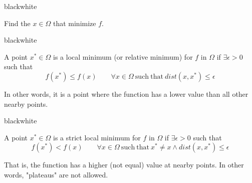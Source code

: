 \begin{remark}{black}{white}
    \begin{definition}
        Find the \( x \in \Omega \) that minimize \( f \).
    \end{definition}
\end{remark}

\begin{remark}{black}{white}
    \begin{definition}
        A point \( x^* \in \Omega \) is a local minimum (or relative minimum) for \( f \) in \( \Omega \) if \( \exists \epsilon > 0 \) such that
        \[
            f(x^*) \leq f(x) \qquad \forall x \in \Omega \mathrm{~such~that~} \mathit{dist}(x, x^*) \leq \epsilon
        \]
    \end{definition}
\end{remark}

In other words, it is a point where the function has a lower value than all other nearby points.

\begin{center}
\end{center}

\begin{remark}{black}{white}
    \begin{definition}
        A point \( x^* \in \Omega \) is a strict local minimum for \( f \) in \( \Omega \) if \( \exists \epsilon > 0 \) such that
        \[
            f(x^*) < f(x) \qquad \forall x \in \Omega \mathrm{~such~that~} x^* \neq x \land \mathit{dist}(x, x^*) \leq \epsilon
        \]
    \end{definition}
\end{remark}

That is, the function has a higher (not equal) value at nearby points. In other words, "plateaus" are not allowed.


